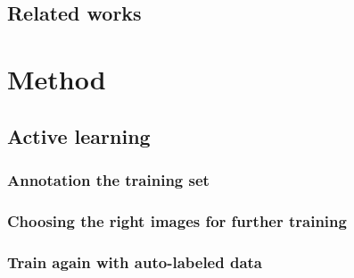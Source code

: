 \documentclass[USenglish]{ifimaster}  %
\begin{document}
\section{Related works}
\newpage
\chapter{Method}
\section{Active learning}
\subsection{Annotation the training set}
\subsection{Choosing the right images for further training}
\subsection{Train again with auto-labeled data}
\end{document}
